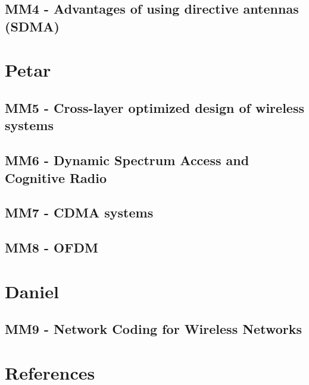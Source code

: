 \chapter{MM4 - Advantages of using directive antennas (SDMA)}





\part{Petar}
\chapter{MM5 - Cross-layer optimized design of wireless systems}






\chapter{MM6 - Dynamic Spectrum Access and Cognitive Radio}


\chapter{MM7 - CDMA systems}



\chapter{MM8 - OFDM}


\part{Daniel}
\chapter{MM9 - Network Coding for Wireless Networks}






\part{References}






